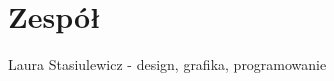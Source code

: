 \documentclass[a4paper]{scrreprt}
\begin{document}





\chapter{Zespół}
Laura Stasiulewicz - design, grafika, programowanie



%
%
\end{document}
